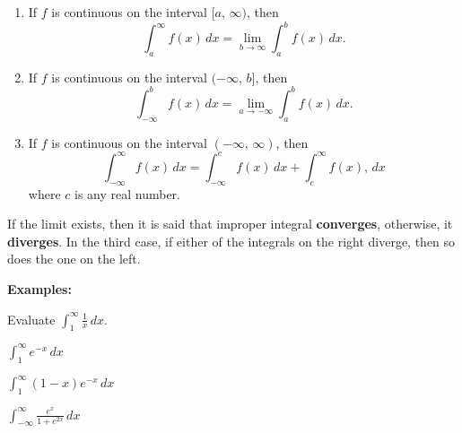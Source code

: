 \documentclass[addpoints, 12pt]{exam}
\begin{document}
\begin{tcolorbox}[title= DEFINITION OF IMPROPER INTEGRALS WITH INFINITE BOUNDS,colframe=black,sharp corners,colback=white,colbacktitle=white,coltitle=black]

    \begin{enumerate}
        \item If $f$ is continuous on the interval $[a,\,\infty)$, then 
        \[\int_a^\infty f(x)\,dx=\lim_{b\to\infty}\int_a^b f(x)\,dx.\]
        \item If $f$ is continuous on the interval $(-\infty,\,b]$, then 
        \[\int_{-\infty}^b f(x)\,dx=\lim_{a\to-\infty}\int_a^b f(x)\,dx.\]
        \item If $f$ is continuous on the interval $(-\infty,\,\infty)$, then 
        \[\int_{-\infty}^\infty f(x)\,dx=\int_{-\infty}^c f(x)\,dx + \int_c^{\infty} f(x),\,dx\]
        where $c$ is any real number.
    \end{enumerate}
    
    If the limit exists, then it is said that improper integral \textbf{converges}, otherwise, it \textbf{diverges}. In the third case, if either of the integrals on the right diverge, then so does the one on the left.

\end{tcolorbox}

\textbf{Examples:}
\begin{questions}
    \question Evaluate $\displaystyle\int_1^\infty \frac{1}{x}\,dx$.
    
    \newpage
    
    \begin{minipage}{.45\linewidth}
        \question $\displaystyle\int_1^\infty e^{-x}\,dx$
    \end{minipage}
    \hfill
    \begin{minipage}{.45\linewidth}
        \question $\displaystyle\int_1^\infty (1-x)e^{-x} \,dx$
    \end{minipage}

    
    
    \question $\displaystyle\int_{-\infty}^\infty\frac{e^x}{1+e^{2x}}\,dx$


\end{questions}

\newpage
\end{document}
